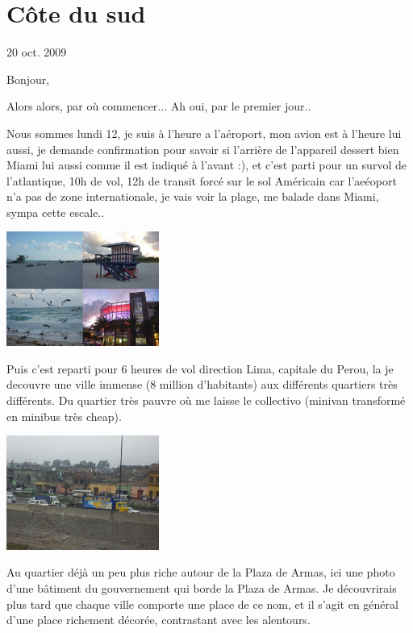 \section{Côte du sud}

20 oct. 2009

\begin{multicols}{2}

Bonjour,

Alors alors, par où commencer... Ah oui, par le premier jour..

Nous sommes lundi 12, je suis à l'heure a l'aéroport, mon avion est à l'heure lui aussi, je demande confirmation pour savoir si l'arrière de l'appareil dessert bien Miami lui aussi comme il est indiqué à l'avant :), et c'est parti pour un survol de l'atlantique, 10h de vol, 12h de transit forcé sur le sol Américain car l'aeéoport n'a pas de zone internationale, je vais voir la plage, me balade dans Miami, sympa cette escale..

\smallbreak
\hspace*{-0.65cm}
\includegraphics[width=5cm]{articles/Cote-du-sud/1255996649K0tQ.jpg}
\smallbreak

Puis c'est reparti pour 6 heures de vol direction Lima, capitale du Perou, la je decouvre une ville immense (8 million d'habitants) aux différents quartiers très différents. Du quartier très pauvre où me laisse le collectivo (minivan transformé en minibus très cheap).

\smallbreak
\hspace*{-0.65cm}
\includegraphics[width=5cm]{articles/Cote-du-sud/1255996655Vfsf.jpg}
\smallbreak

Au quartier déjà un peu plus riche autour de la Plaza de Armas, ici une photo d'une bâtiment du gouvernement qui borde la Plaza de Armas. Je découvrirais plus tard que chaque ville comporte une place de ce nom, et il s'agit en général d'une place richement décorée, contrastant avec les alentours.


\end{multicols}
